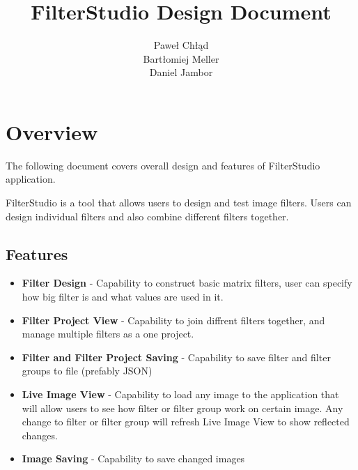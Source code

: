 \documentclass{article}
\title{FilterStudio Design Document}
\author{Paweł Chłąd \\ Bartłomiej Meller \\ Daniel Jambor }
\begin{document}
\maketitle
\pagebreak


\section{Overview}

The following document covers overall design and features of FilterStudio application.

FilterStudio is a tool that allows users to design and test image filters. Users can 
design individual filters and also combine different filters together. 


\subsection{Features}


\begin{itemize}
\item \textbf{Filter Design} - Capability to construct basic matrix filters, user can specify
how big filter is and what values are used in it.

\item \textbf{Filter Project View} - Capability to join diffrent filters together, and manage
multiple filters as a one project.

\item \textbf{Filter and Filter Project Saving} - Capability to save filter and filter groups to file (prefably JSON)
\item \textbf{Live Image View} - Capability to load any image to the application that will allow users to see
how filter or filter group work on certain image. Any change to filter or filter group will refresh Live Image View to show
reflected changes.
\item \textbf{Image Saving} - Capability to save changed images 
\end{itemize}
\end{document}
